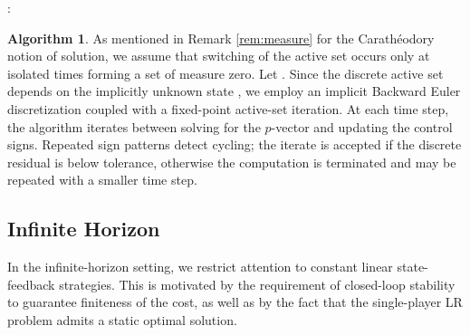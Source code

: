 \documentclass[letterpaper, 10 pt, conference]{ieeeconf}
\newcommand\mydots{\hbox to 0.7em{.\hss.\hss.}}
\theoremstyle{definition}
\newtheorem{alg}{Algorithm}
\begin{document}
\begin{algorithm}[H]
\caption{Backward Euler with Active-Set Iteration}
\label{alg:BE-AS}
\begin{algorithmic}
\Require  {}
\State  {}

\For{ \scalebox{.9}{$k=M,\mydots,1$}}
\State  {}
\Repeat \hspace{2mm}  :
\State  {}
\For{$i=1,\mydots,N$}
\State {}
\State  {}
\EndFor
\State  {}
\State  {}
\State {}
\EndFor
\State \Return  {}
\end{algorithmic}
\end{algorithm}
\begin{alg}
    As mentioned in Remark \ref{rem:measure} for the Carathéodory notion of solution, we assume that switching of the active set occurs only at isolated times forming a set of measure zero. Let . Since the discrete active set  depends on the implicitly unknown state , we employ an implicit Backward Euler discretization coupled with a fixed-point active-set iteration. At each time step, the algorithm iterates between solving for the $p$-vector and updating the control signs. Repeated sign patterns detect cycling; the iterate is accepted if the discrete residual is below tolerance, otherwise the computation is terminated and may be repeated with a smaller time step.
\end{alg}
\subsection{Infinite Horizon}
In the infinite-horizon setting, we restrict attention to constant linear state-feedback strategies. This is motivated by the requirement of closed-loop stability to guarantee finiteness of the cost, as well as by the fact that the single-player LR problem admits a static optimal solution. 
\end{document}
